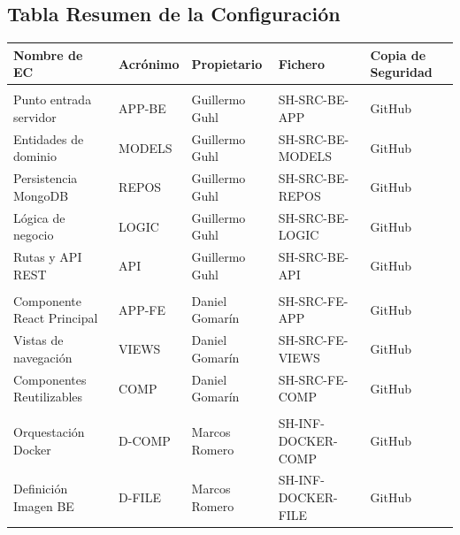\documentclass[11pt,a4paper]{article}
\begin{document}
\subsection{Tabla Resumen de la Configuración}
\begin{table}[H]
\centering
\small
\begin{tabularx}{\textwidth}{@{}l l l l L@{}}
\toprule
\textbf{Nombre de EC} & \textbf{Acrónimo} & \textbf{Propietario} & \textbf{Fichero} & \textbf{Copia de Seguridad} \\ \midrule

  \\
Punto entrada servidor & APP-BE & Guillermo Guhl & SH-SRC-BE-APP & GitHub \\
Entidades de dominio & MODELS & Guillermo Guhl & SH-SRC-BE-MODELS & GitHub \\
Persistencia MongoDB & REPOS & Guillermo Guhl & SH-SRC-BE-REPOS & GitHub \\
Lógica de negocio & LOGIC & Guillermo Guhl & SH-SRC-BE-LOGIC &  GitHub \\
Rutas y API REST & API & Guillermo Guhl & SH-SRC-BE-API & GitHub \\

\midrule
{}  \\
Componente React Principal & APP-FE & Daniel Gomarín & SH-SRC-FE-APP & GitHub \\
Vistas de navegación & VIEWS & Daniel Gomarín & SH-SRC-FE-VIEWS & GitHub \\
Componentes Reutilizables & COMP & Daniel Gomarín & SH-SRC-FE-COMP & GitHub \\

\midrule
{}  \\
Orquestación Docker & D-COMP & Marcos Romero & SH-INF-DOCKER-COMP & GitHub \\
Definición Imagen BE & D-FILE & Marcos Romero & SH-INF-DOCKER-FILE & GitHub \\


\end{tabularx}
\end{table}
\end{document}
